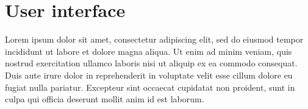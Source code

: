 \section{User interface}
Lorem ipsum dolor sit amet, consectetur adipiscing elit, sed do eiusmod tempor incididunt ut labore et dolore magna aliqua. Ut enim ad minim veniam, quis nostrud exercitation ullamco laboris nisi ut aliquip ex ea commodo consequat. Duis aute irure dolor in reprehenderit in voluptate velit esse cillum dolore eu fugiat nulla pariatur. Excepteur sint occaecat cupidatat non proident, sunt in culpa qui officia deserunt mollit anim id est laborum.
